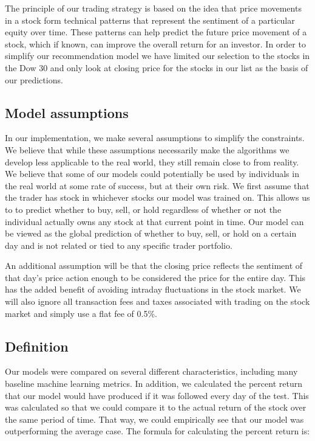 \documentclass{article}
\begin{document}
The principle of our trading strategy is based on the idea that price movements in a stock form technical patterns that represent the sentiment of a particular equity over time. These patterns can help predict the future price movement of a stock, which if known, can improve the overall return for an investor.  In order to simplify our recommendation model we have limited our selection to the stocks in the Dow 30 and only look at closing price for the stocks in our list as the basis of our predictions.

\subsection{Model assumptions}
In our implementation, we make several assumptions to simplify the constraints. We believe that while these assumptions necessarily make the algorithms we develop less applicable to the real world, they still remain close to from reality. We believe that some of our models could potentially be used by individuals in the real world at some rate of success, but at their own risk. We first assume that the trader has stock in whichever stocks our model was trained on. This allows us to to predict whether to buy, sell, or hold regardless of whether or not the individual actually owns any stock at that current point in time. Our model can be viewed as the global prediction of whether to buy, sell, or hold on a certain day and is not related or tied to any specific trader portfolio.

An additional assumption will be that the closing price reflects the sentiment of that day's price action enough to be considered the price for the entire day. This has the added benefit of avoiding intraday fluctuations in the stock market. We will also ignore all transaction fees and taxes associated with trading on the stock market and simply use a flat fee of 0.5\%.

\subsection{Definition}
Our models were compared on several different characteristics, including many baseline machine learning metrics. In addition, we calculated the percent return that our model would have produced if it was followed every day of the test. This was calculated so that we could compare it to the actual return of the stock over the same period of time. That way, we could empirically see that our model was outperforming the average case. The formula for calculating the percent return is:
\end{document}
